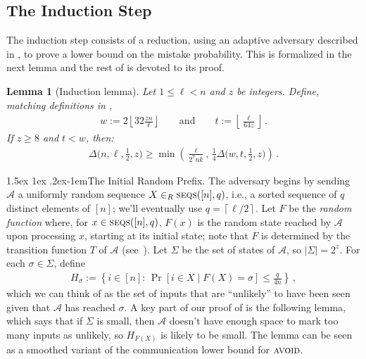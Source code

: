 \documentclass[10pt,a4paper]{article}
\makeatletter
\newtheorem{lemma}[theorem]{Lemma}
\theoremstyle{definition}
\theoremstyle{remark}
\newcommand\squeezepar{\@startsection{paragraph}{4}%
{\z@}{1.5ex \@plus1ex \@minus.2ex}{-1em}{\normalfont\normalsize\bfseries}}
\newcommand{\mypara}[1]{\squeezepar{{#1}.}}
\newcommand{\cA}{\mathcal{A}}
\newcommand{\ceil}[1]{{\left\lceil{#1}\right\rceil}}
\newcommand{\floor}[1]{{\left\lfloor{#1}\right\rfloor}}
\newcommand{\avoid}{\textsc{avoid}\xspace}
\newcommand{\rl}{\mathbf{\ell}}             %
\newcommand{\SSD}[2]{\textsc{seqs}(#1,#2)}  %
\newcommand{\Mstk}{\Delta}                  %
\makeatother
\begin{document}
\begin{itemize}
\begin{itemize}
\subsection{The Induction Step} \label{subsec:rt-ind-step}

The induction step consists of a reduction, using an adaptive adversary
described in , to prove a lower bound on the
mistake probability. This is formalized in the next lemma and the rest of
 is devoted to its proof.

\begin{lemma}[Induction lemma]\label{lem:mif-rt-lb-step}
  Let $1 \le \rl < n$ and $z$ be integers. Define, matching definitions in ,
  \begin{align}
    w := 2 \floor{32 \frac{z n}{\rl}} \qquad \text{and} \qquad 
    t := \floor{\frac{\rl}{64 z}} \,.
    \label{eq:w-t-def}
  \end{align}
  If $z \ge 8$ and $t < w$, then:
  \begin{align}
    \Mstk\Big(n,\rl,\frac{1}{2},z\Big) \ge \min\left( \frac{\rl}{2^7 n k}, \,
      \frac{1}{4} \Mstk\Big(w,t,\frac{1}{2},z\Big) \right) \,. 
      \label{eq:mif-rt-lb-step-err}
  \end{align}
\end{lemma}

\mypara{The Initial Random Prefix} The adversary begins by sending $\cA$ a
uniformly random sequence $X \in_R \SSD{[n]}{q}$, i.e., a sorted sequence of
$q$ distinct elements of $[n]$; we'll eventually use $q = \ceil{\rl/2}$.  Let
$F$ be the {\em random function} where, for $x \in \SSD{[n]}{q}$, $F(x)$ is
the random state reached by $\cA$ upon processing $x$, starting at its initial
state; note that $F$ is determined by the transition function $T$ of $\cA$
(see~).  Let $\Sigma$ be the set of states of $\cA$, so
$|\Sigma| = 2^z$. For each $\sigma \in \Sigma$, define
\begin{align}
  H_{\sigma} := \left\{ i\in[n]:\, \Pr[i\in X \mid F(X) = \sigma] \le \frac{q}{4n} \right\} \,,
  \label{eq:H-def}
\end{align}
which we can think of as the set of inputs that are ``unlikely'' to have been
seen given that $\cA$ has reached $\sigma$.  A key part of our proof of
 is the following lemma, which says that if $\Sigma$
is small, then $\cA$ doesn't have enough space to mark too many inputs as
unlikely, so $H_{F(X)}$ is likely to be small. The lemma can be seen as a
smoothed variant of the communication lower bound for $\avoid$.


\end{itemize}
\end{itemize}
\end{document}
